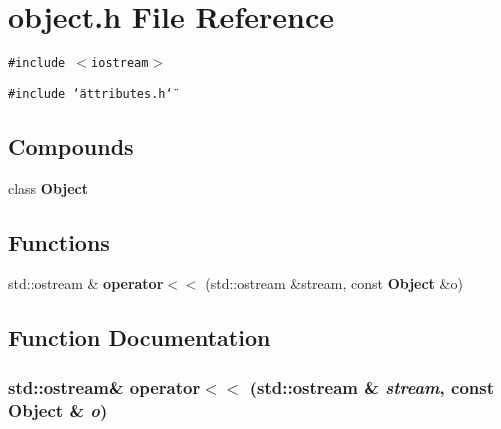 \section{object.h File Reference}
\label{object_8h}
{\tt \#include $<$iostream$>$}\par
{\tt \#include \char`\"{}attributes.h\char`\"{}}\par
\subsection*{Compounds}
\begin{CompactItemize}
\item 
class {\bf Object}
\end{CompactItemize}
\subsection*{Functions}
\begin{CompactItemize}
\item 
std::ostream \& {\bf operator$<$$<$} (std::ostream \&stream, const {\bf Object} \&o)
\end{CompactItemize}


\subsection{Function Documentation}
\subsubsection{\setlength{\rightskip}{0pt plus 5cm}std::ostream\& operator$<$$<$ (std::ostream \& {\em stream}, const {\bf Object} \& {\em o})\hspace{0.3cm}{\tt  [inline]}}\label{object_8h_a0}


